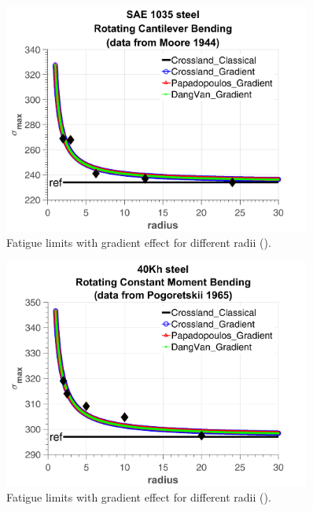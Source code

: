 \begin{figure}[!h]
	\begin{center}
		\includegraphics[width=0.9\textwidth]{figures//1035steel.png} 
		\caption{Fatigue limits with gradient effect for different radii (\cite{Pogoretskii1966}).}
		\label{fig.gradientcalibration3}
	\end{center}
\end{figure}

\begin{figure}[!h]
	\begin{center}
		\includegraphics[width=0.9\textwidth]{figures//40khsteel.png} 
		\caption{Fatigue limits with gradient effect for different radii (\cite{Papadopoulos1996513}).}
		\label{fig.gradientcalibration4}
	\end{center}
\end{figure}
\newpage

